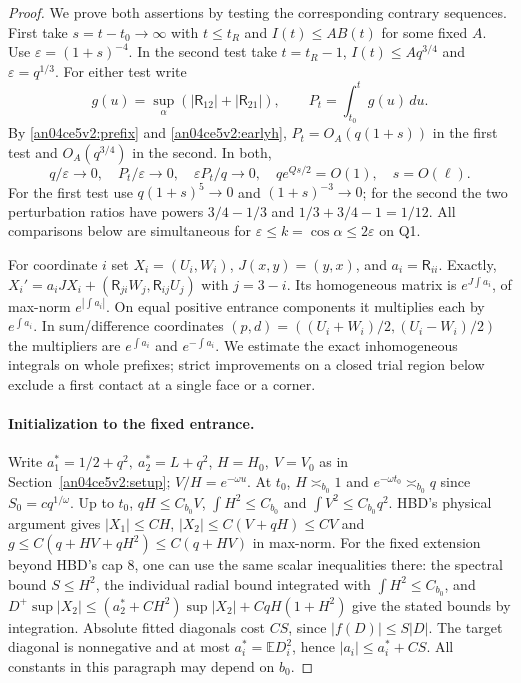 \documentclass[11pt]{article}
\newcommand{\E}{\mathbb E}
\newcommand{\eps}{\varepsilon}
\begin{document}
\begin{proof}
We prove both assertions by testing the corresponding contrary sequences. First take $s=t-t_0\to\infty$ with $t\le t_R$ and $I(t)\le A B(t)$ for some fixed $A$. Use $\eps=(1+s)^{-4}$. In the second test take $t=t_R-1$, $I(t)\le A q^{3/4}$ and $\eps=q^{1/3}$. For either test write
\[
 g(u)=\sup_\alpha(|\mathsf R_{12}|+|\mathsf R_{21}|),\qquad
 P_t=\int_{t_0}^t g(u)\,du .
\]
By \eqref{an04ce5v2:prefix} and \eqref{an04ce5v2:earlyh}, $P_t=O_A(q(1+s))$ in the first test and $O_A(q^{3/4})$ in the second. In both,
\begin{equation}\label{an04ce5v2:units}
 q/\eps\to0,\quad P_t/\eps\to0,\quad
 \eps P_t/q\to0,\quad q e^{Qs/2}=O(1),\quad s=O(\ell).
\end{equation}
For the first test use $q(1+s)^5\to0$ and $(1+s)^{-3}\to0$; for the second the two perturbation ratios have powers $3/4-1/3$ and $1/3+3/4-1=1/12$. All comparisons below are simultaneous for $\eps\le k=\cos\alpha\le2\eps$ on Q1.

For coordinate $i$ set $X_i=(U_i,W_i)$, $J(x,y)=(y,x)$, and $a_i=\mathsf R_{ii}$. Exactly,
$X_i'=a_i JX_i+(\mathsf R_{j i}W_j,\mathsf R_{i j}U_j)$ with $j=3-i$.
Its homogeneous matrix is $e^{J\int a_i}$, of max-norm $e^{|\int a_i|}$. On equal positive entrance components it multiplies each by $e^{\int a_i}$. In sum/difference coordinates $(p,d)=((U_i+W_i)/2,(U_i-W_i)/2)$ the multipliers are $e^{\int a_i}$ and $e^{-\int a_i}$. We estimate the exact inhomogeneous integrals on whole prefixes; strict improvements on a closed trial region below exclude a first contact at a single face or a corner.

\paragraph{Initialization to the fixed entrance.}
Write $a_1^*=1/2+q^2,\ a_2^*=L+q^2$, $H=H_0,\ V=V_0$ as in Section~\ref{an04ce5v2:setup}; $V/H=e^{-\omega u}$. At $t_0$, $H\asymp_{b_0}1$ and $e^{-\omega t_0}\asymp_{b_0}q$ since $S_0=cq^{1/\omega}$. Up to $t_0$, $qH\le C_{b_0}V$, $\int H^2\le C_{b_0}$ and $\int V^2\le C_{b_0}q^2$. HBD's physical argument gives $|X_1|\le C H$, $|X_2|\le C(V+qH)\le C V$ and $g\le C(q+HV+qH^2)\le C(q+HV)$ in max-norm. For the fixed extension beyond HBD's cap $8$, one can use the same scalar inequalities there: the spectral bound $S\le H^2$, the individual radial bound integrated with $\int H^2\le C_{b_0}$, and $D^+\sup|X_2|\le(a_2^*+CH^2)\sup|X_2|+CqH(1+H^2)$ give the stated bounds by integration. Absolute fitted diagonals cost $C S$, since $|f(D)|\le S|D|$. The target diagonal is nonnegative and at most $a_i^*=\E D_i^2$, hence $|a_i|\le a_i^*+CS$. All constants in this paragraph may depend on $b_0$.


\end{proof}
\end{document}
